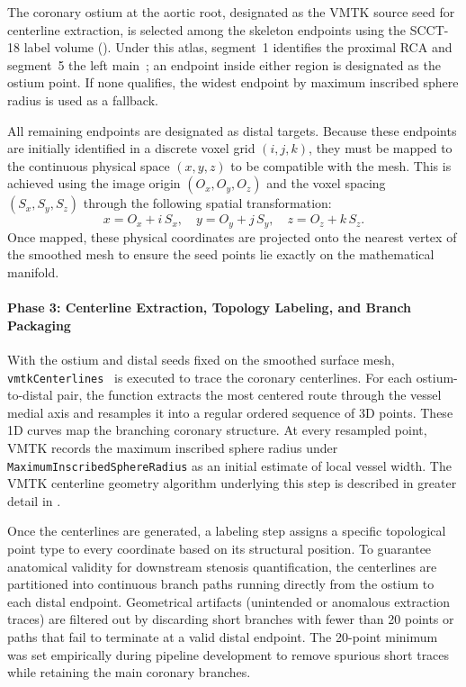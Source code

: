 The coronary ostium at the aortic root, designated as the VMTK source seed for centerline extraction, is selected among the skeleton endpoints using the SCCT-18 label volume (). Under this atlas, segment~1 identifies the proximal RCA and segment~5 the left main~\cite{leipsic2014}; an endpoint inside either region is designated as the ostium point. If none qualifies, the widest endpoint by maximum inscribed sphere radius is used as a fallback.

All remaining endpoints are designated as distal targets. Because these endpoints are initially identified in a discrete voxel grid $(i, j, k)$, they must be mapped to the continuous physical space $(x, y, z)$ to be compatible with the mesh. This is achieved using the image origin $(O_x, O_y, O_z)$ and the voxel spacing $(S_x, S_y, S_z)$ through the following spatial transformation:
\begin{equation}
  x = O_x + i\,S_x,\quad y = O_y + j\,S_y,\quad z = O_z + k\,S_z.
  \label{eq:voxel-to-physical}
\end{equation}
Once mapped, these physical coordinates are projected onto the nearest vertex of the smoothed mesh to ensure the seed points lie exactly on the mathematical manifold.

\paragraph{Phase 3: Centerline Extraction, Topology Labeling, and Branch Packaging}\mbox{}\par\vspace{0.5em}
With the ostium and distal seeds fixed on the smoothed surface mesh, \texttt{vmtkCenterlines}~\cite{izzo2018,piccinelli2009} is executed to trace the coronary centerlines. For each ostium-to-distal pair, the function extracts the most centered route through the vessel medial axis and resamples it into a regular ordered sequence of 3D points. These 1D curves map the branching coronary structure. At every resampled point, VMTK records the maximum inscribed sphere radius under \texttt{MaximumInscribedSphereRadius} as an initial estimate of local vessel width. The VMTK centerline geometry algorithm underlying this step is described in greater detail in .

Once the centerlines are generated, a labeling step assigns a specific topological point type to every coordinate based on its structural position. To guarantee anatomical validity for downstream stenosis quantification, the centerlines are partitioned into continuous branch paths running directly from the ostium to each distal endpoint. Geometrical artifacts (unintended or anomalous extraction traces) are filtered out by discarding short branches with fewer than 20 points or paths that fail to terminate at a valid distal endpoint. The 20-point minimum was set empirically during pipeline development to remove spurious short traces while retaining the main coronary branches.

